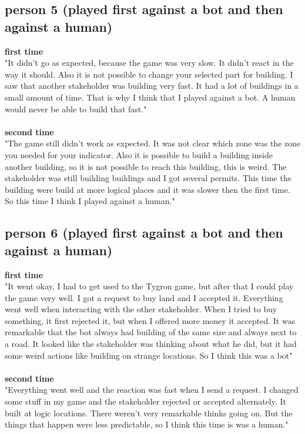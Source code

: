 \subsection{person 5 (played first against a bot and then against a human)}
\textbf{first time}\\
"It didn't go as expected, because the game was very slow. It didn't react in the way it should. Also it is not possible to change your selected part for building. I saw that another stakeholder was building very fast. It had a lot of buildings in a small amount of time. That is why I think that I played against a bot. A human would never be able to build that fast." 
\\ \\
\textbf{second time} \\ 
"The game still didn't work as expected. It was not clear which zone was the zone you needed for your indicator. Also it is possible to build a building inside another building, so it is not possible to reach this building, this is weird. The stakeholder was still building buildings and I got several permits. This time the building were build at more logical places and it was slower then the first time. So this time I think I played against a human."

\subsection{person 6 (played first against a bot and then against a human)}
\textbf{first time}\\
"It went okay, I had to get used to the Tygron game, but after that I could play the game very well. I got a request to buy land and I accepted it. Everything went well when interacting with the other stakeholder. When I tried to buy something, it first rejected it, but when I offered more money it accepted. It was remarkable that the bot always had building of the same size and always next to a road. It looked like the stakeholder was thinking about what he did, but it had some weird actions like building on strange locations. So I think this was a bot"
 \\ \\
\textbf{second time}\\
"Everything went well and the reaction was fast when I send a request. I changed some stuff in my game and the stakeholder rejected or accepted alternately. It built at logic locations. There weren't very remarkable thinks going on. But the things that happen were less predictable, so I think this time is was a human."